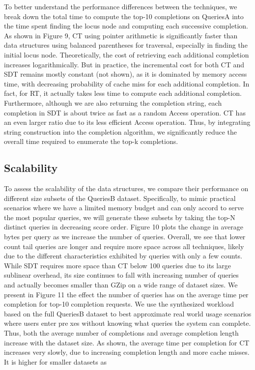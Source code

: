 \documentclass{sig-alternate}
\begin{document}
To better understand the performance differences between
the techniques, we break down the total time to compute the
top-10 completions on QueriesA into the time spent finding
the locus node and computing each successive completion.
As shown in Figure 9, CT using pointer arithmetic is significantly faster than data structures using balanced parentheses
for traversal, especially in finding the initial locus node. Theoretically,
the cost of retrieving each additional completion
increases logarithmically. But in practice, the incremental
cost for both CT and SDT remains mostly constant (not
shown), as it is dominated by memory access time, with
decreasing probability of cache miss for each additional completion.
In fact, for RT, it actually takes less time to compute
each additional completion. Furthermore, although we are
also returning the completion string, each completion in SDT
is about twice as fast as a random Access operation. CT has
an even larger ratio due to its less efficient Access operation.
Thus, by integrating string construction into the completion
algorithm, we significantly reduce the overall time required to
enumerate the top-k completions.

\subsection{Scalability}

To assess the scalability of the data structures, we compare
their performance on different size subsets of the QueriesB
dataset. Specifically, to mimic practical scenarios where we
have a limited memory budget and can only accord to serve
the most popular queries, we will generate these subsets by
taking the top-N distinct queries in decreasing score order.
Figure 10 plots the change in average bytes per query as we
increase the number of queries. Overall, we see that lower
count tail queries are longer and require more space across all
techniques, likely due to the different characteristics exhibited
by queries with only a few counts. While SDT requires more
space than CT below 100 queries due to its large sublinear
overhead, its size continues to fall with increasing number of
queries and actually becomes smaller than GZip on a wide
range of dataset sizes.
We present in Figure 11 the effect the number of queries
has on the average time per completion for top-10 completion
requests. We use the synthesized workload based on the full
QueriesB dataset to best approximate real world usage scenarios
where users enter prexes without knowing what queries
the system can complete. Thus, both the average number of
completions and average completion length increase with the
dataset size. As shown, the average time per completion for
CT increases very slowly, due to increasing completion length
and more cache misses. It is higher for smaller datasets as
\end{document}
